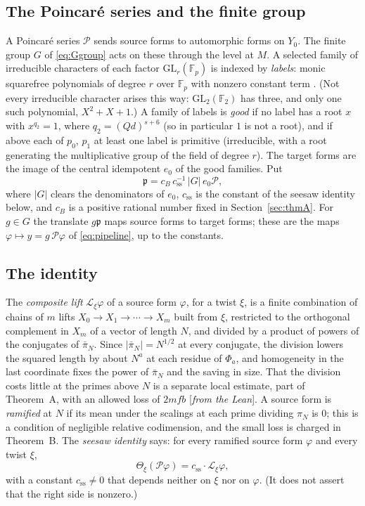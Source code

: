 \documentclass[11pt]{amsart}
\numberwithin{equation}{section}
\theoremstyle{definition}
\theoremstyle{remark}
\newcommand{\status}[1]{\textup{[\emph{#1}]}}
\begin{document}
\subsection*{The Poincar\'e series and the finite group}
A Poincar\'e series $\mathcal P$ sends source forms to automorphic forms on $Y_0$. The finite group $G$ of \eqref{eq:Ggroup} acts on these through the level at $M$. A selected family of irreducible characters of each factor $\mathrm{GL}_r(\mathbb F_p)$ is indexed by \emph{labels}: monic squarefree polynomials of degree $r$ over $\mathbb F_p$ with nonzero constant term \cite{green}. (Not every irreducible character arises this way: $\mathrm{GL}_2(\mathbb F_2)$ has three, and only one such polynomial, $X^2+X+1$.) A family of labels is \emph{good} if no label has a root $x$ with $x^{q_2}=1$, where $q_2=(Qd)^{s+6}$ (so in particular $1$ is not a root), and if above each of $p_0$, $p_1$ at least one label is primitive (irreducible, with a root generating the multiplicative group of the field of degree $r$). The target forms are the image of the central idempotent $e_0$ of the good families. Put
\begin{equation}\label{eq:normalizedP}
 \mathfrak p=c_B\,c_{\mathrm{ss}}^{-1}\,|G|\,e_0\mathcal P,
\end{equation}
where $|G|$ clears the denominators of $e_0$, $c_{\mathrm{ss}}$ is the constant of the seesaw identity below, and $c_B$ is a positive rational number fixed in Section~\ref{sec:thmA}. For $g\in G$ the translate $g\mathfrak p$ maps source forms to target forms; these are the maps $\varphi\mapsto y=g\,\mathcal P\varphi$ of \eqref{eq:pipeline}, up to the constants.

\subsection*{The identity}
The \emph{composite lift} $\mathcal L_\xi\varphi$ of a source form $\varphi$, for a twist $\xi$, is a finite combination of chains of $m$ lifts $X_0\to X_1\to\cdots\to X_m$ built from $\xi$, restricted to the orthogonal complement in $X_m$ of a vector of length $N$, and divided by a product of powers of the conjugates of $\bar\pi_N$. Since $|\bar\pi_N|=N^{1/2}$ at every conjugate, the division lowers the squared length by about $N^a$ at each residue of $\Phi_a$, and homogeneity in the last coordinate fixes the power of $\bar\pi_N$ and the saving in size. That the division costs little at the primes above $N$ is a separate local estimate, part of Theorem~A, with an allowed loss of $2mfb$ \status{from the Lean}. A source form is \emph{ramified} at $N$ if its mean under the scalings at each prime dividing $\pi_N$ is $0$; this is a condition of negligible relative codimension, and the small loss is charged in Theorem~B. The \emph{seesaw identity} says: for every ramified source form $\varphi$ and every twist $\xi$,
\begin{equation}\label{eq:seesaw}
 \Theta_\xi(\mathcal P\varphi)=c_{\mathrm{ss}}\cdot\mathcal L_\xi\varphi,
\end{equation}
with a constant $c_{\mathrm{ss}}\ne0$ that depends neither on $\xi$ nor on $\varphi$. (It does not assert that the right side is nonzero.)
\end{document}
